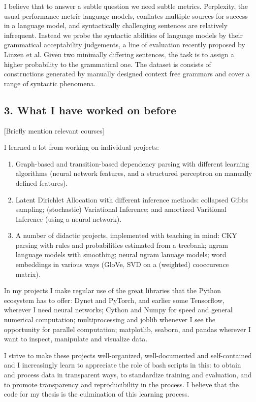 \documentclass[]{article}
\begin{document}
I believe that to answer a subtle question we need subtle metrics.
Perplexity, the usual performance metric language models, conflates
multiple sources for success in a language model, and syntactically
challenging sentences are relatively infrequent. Instead we probe the
syntactic abilities of language models by their grammatical
acceptability judgements, a line of evaluation recently proposed by
Linzen et al. Given two minimally differing sentences, the task is to
assign a higher probability to the grammatical one. The dataset is
consists of constructions generated by manually designed context free
grammars and cover a range of syntactic phenomena.

\subsection{3. What I have worked on
before}\label{what-i-have-worked-on-before}

{[}Briefly mention relevant courses{]}

I learned a lot from working on individual projects:

\begin{enumerate}
\def\labelenumi{\arabic{enumi}.}
\item
  Graph-based and transition-based dependency parsing with different
  learning algorithms (neural network features, and a structured
  perceptron on manually defined features).
\item
  Latent Dirichlet Allocation with different inference methods:
  collapsed Gibbs sampling; (stochastic) Variational Inference; and
  amortized Varitional Inference (using a neural network).
\item
  A number of didactic projects, implemented with teaching in mind: CKY
  parsing with rules and probabilities estimated from a treebank; ngram
  language models with smoothing; neural ngram lanuage models; word
  embeddings in various ways (GloVe, SVD on a (weighted) cooccurence
  matrix).
\end{enumerate}

In my projects I make regular use of the great libraries that the Python
ecosystem has to offer: Dynet and PyTorch, and earlier some Tensorflow,
wherever I need neural networks; Cython and Numpy for speed and general
numerical computation; multiprocessing and joblib whenever I see the
opportunity for parallel computation; matplotlib, seaborn, and pandas
wherever I want to inspect, manipulate and visualize data.

I strive to make these projects well-organized, well-documented and
self-contained and I increasingly learn to appreciate the role of bash
scripts in this: to obtain and process data in transparent ways, to
standardize training and evaluation, and to promote transparency and
reproducibility in the process. I believe that the code for my thesis is
the culmination of this learning process.
\end{document}
